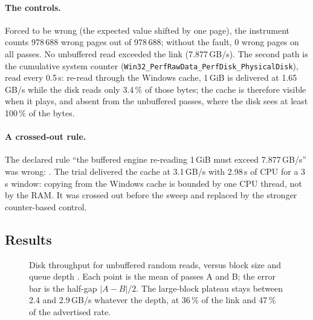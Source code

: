 \paragraph{The controls.} Forced to be wrong (the expected value shifted by one page), the instrument counts 978\,688 wrong pages out of 978\,688; without the fault, 0 wrong pages on all passes. No unbuffered read exceeded the link (7.877\,GB/s). The second path is the cumulative system counter (\texttt{Win32\_PerfRawData\_PerfDisk\_PhysicalDisk}), read every 0.5\,s: re-read through the Windows cache, 1\,GiB is delivered at 1.65\,GB/s while the disk reads only 3.4\,\% of those bytes; the cache is therefore visible when it plays, and absent from the unbuffered passes, where the disk sees at least 100\,\% of the bytes.

\paragraph{A crossed-out rule.} The declared rule \enquote{the buffered engine re-reading 1\,GiB must exceed 7.877\,GB/s} was wrong: . The trial delivered the cache at 3.1\,GB/s with 2.98\,s of CPU for a 3\,s window: copying from the Windows cache is bounded by one CPU thread, not by the RAM. It was crossed out before the sweep and replaced by the stronger counter-based control.

\subsection{Results}

\begin{figure}[ht]
\centering
\GrapheDisque
\caption[Disk throughput versus block size and queue depth]{Disk throughput for unbuffered random reads, versus block size and queue depth \mes. Each point is the mean of passes A and B; the error bar is the half-gap $|A-B|/2$. The large-block plateau stays between 2.4 and 2.9\,GB/s whatever the depth, at 36\,\% of the link and 47\,\% of the advertised rate.}
\label{fig:disque}
\end{figure}

